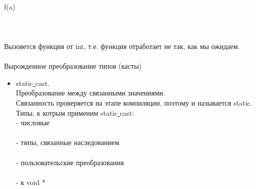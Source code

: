 \documentclass[a4paper,10pt]{article}
\begin{document}
\\f(a)
\\
\hline
\\
\\

\\Вызовется функция от int, т.е. функция отработает не так, как мы ожидаем. 
\\

\\Вырожденное преобразование типов (касты)
\\
\begin{itemize}
    \item static\underline{ }cast. 
    \\Преобразование между связанными значениями.
    \\Связанность проверяется на этапе компиляции, поэтому и называется static.
    \\Типы, к котрым применим static\underline{ }cast:
    \\ - числовые
    \\
    \\ - типы, связанные наследованием
    \\
    \\ - пользовательские преобразования
    \\
    \\ - к void *
    \\ 
    

\end{itemize}
\end{document}
